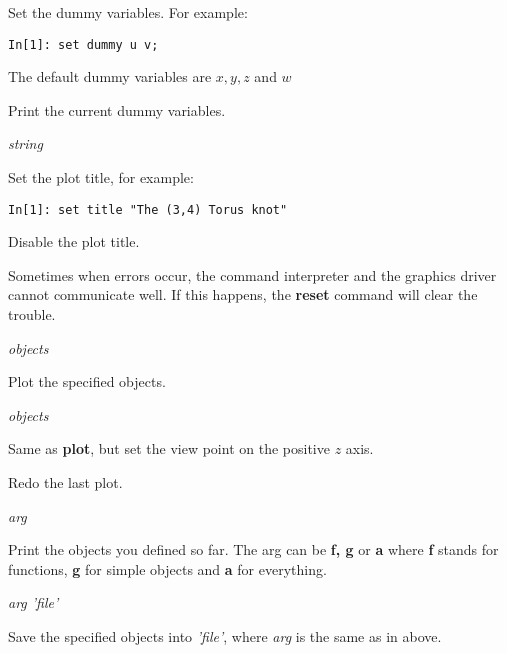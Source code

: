 Set the dummy variables. For example:
\begin{verbatim}
In[1]: set dummy u v;
\end{verbatim}
The default dummy variables are $x,y,z$ and $w$

\vspace{8mm}

Print the current dummy variables.

\vspace{8mm}
 {\it string}

Set the plot title, for example:

\begin{verbatim}
In[1]: set title "The (3,4) Torus knot"
\end{verbatim}


\vspace{8mm}

Disable the plot title.



\vspace{8mm}

Sometimes when errors occur, the command interpreter and the
graphics driver cannot communicate well. If this happens, the
{\bf reset} command will clear the trouble.


\vspace{8mm}
 {\it objects}

Plot the specified objects.

\vspace{8mm}
 {\it objects}

Same as {\bf plot}, but set the view point on the positive $z$ axis.

	
\vspace{8mm}

Redo the last plot.

\vspace{8mm}
 {\it arg}

Print the objects you defined so far. The arg can be
{\bf f, g} or {\bf a} where {\bf f} stands for functions,
{\bf g} for simple objects and
{\bf a} for everything. 

\vspace{8mm}
 {\it arg 'file'}

Save the specified objects into {\it 'file'}, where {\it arg}
is the same as in above.

